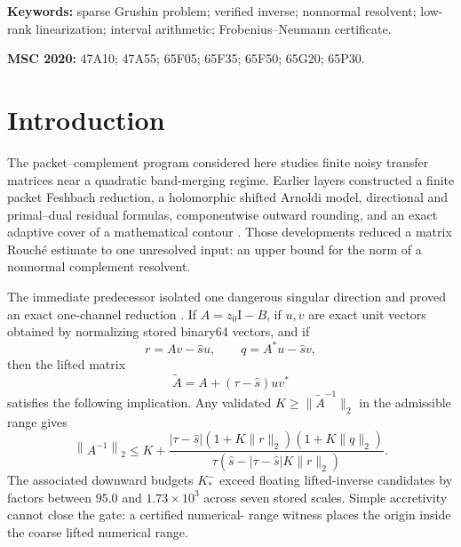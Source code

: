 \documentclass[11pt]{article}
\theoremstyle{definition}
\theoremstyle{remark}
\newcommand{\Id}{\mathrm I}
\newcommand{\norm}[1]{\left\lVert#1\right\rVert}
\newcommand{\Atilde}{\widetilde A}
\begin{document}
\noindent\textbf{Keywords:} sparse Grushin problem; verified inverse;
nonnormal resolvent; low-rank linearization; interval arithmetic;
Frobenius--Neumann certificate.

\medskip
\noindent\textbf{MSC 2020:} 47A10; 47A55; 65F05; 65F35; 65F50; 65G20;
65P30.


\section{Introduction}
\label{sec:introduction}

The packet--complement program considered here studies finite noisy transfer
matrices near a quadratic band-merging regime.  Earlier layers constructed a
finite packet Feshbach reduction, a holomorphic shifted Arnoldi model,
directional and primal--dual residual formulas, componentwise outward
rounding, and an exact adaptive cover of a mathematical contour
\citep{WangContourFeshbach2026,WangDirectionalRouche2026,
WangPrimalDual2026,WangOutwardCode2026,WangArcwise2026}.  Those developments
reduced a matrix Rouch\'e estimate to one unresolved input: an upper bound for
the norm of a nonnormal complement resolvent.

The immediate predecessor isolated one dangerous singular direction and
proved an exact one-channel reduction \citep{WangDeflated2026}.  If
$A=z_0\Id-B$, if $u,v$ are exact unit vectors obtained by normalizing stored
binary64 vectors, and if
\[
 r=Av-\widehat s u,
 \qquad
 q=A^*u-\widehat s v,
\]
then the lifted matrix
\begin{equation}
 \Atilde=A+(\tau-\widehat s)uv^*
 \label{eq:intro-lift}
\end{equation}
satisfies the following implication.  Any validated
$K\geq\|\Atilde^{-1}\|_2$ in the admissible range gives
\begin{equation}
 \norm{A^{-1}}_2
 \leq K+
 \frac{|\tau-\widehat s|(1+K\|r\|_2)(1+K\|q\|_2)}
 {\tau(\widehat s-|\tau-\widehat s|K\|r\|_2)}.
 \label{eq:predecessor-bound}
\end{equation}
The associated downward budgets $K_*^-$ exceed floating lifted-inverse
candidates by factors between $95.0$ and $1.73\times10^3$ across seven stored
scales.  Simple accretivity cannot close the gate: a certified numerical-
range witness places the origin inside the coarse lifted numerical range.
\end{document}
